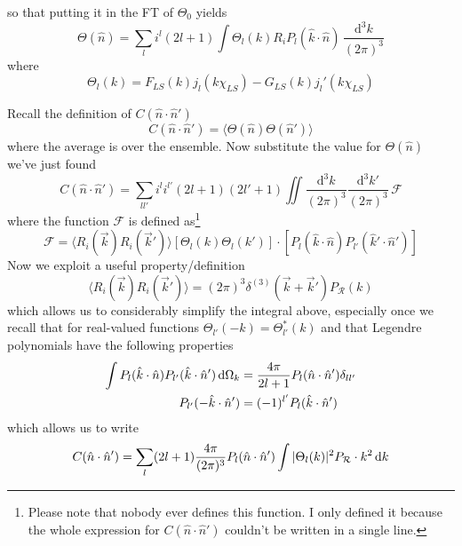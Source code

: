 so that putting it in the FT of $\Theta_{0}$ yields
\begin{equation}
    \Theta(\hat{n}) = \sum_{l}i^{l}(2l+1)\int \Theta_{l}(k)R_{i} P_{l}(\hat{k}\cdot\hat{n})\,\frac{\text{d}^{3}k}{(2\pi)^{3}}
\end{equation}
where 
\begin{equation}
    \Theta_{l}(k) = F_{LS}(k)j_{l}(k\chi_{LS})-G_{LS}(k)j_{l}'(k\chi_{LS})
\end{equation}
\par Recall the definition of $C(\hat{n}\cdot \hat{n}')$
\begin{equation}
    C(\hat{n}\cdot \hat{n}') = \langle \Theta (\hat{n})\Theta(\hat{n}')\rangle
\end{equation}
where the average is over the ensemble. Now substitute the value for $\Theta(\hat{n})$ we've just found
\begin{equation}
    C(\hat{n}\cdot \hat{n}') = \sum_{ll'}i^{l}i^{l'}(2l+1)(2l'+1) \iint \frac{\text{d}^{3}k}{(2\pi)^{3}} \frac{\text{d}^{3}k'}{(2\pi)^{3}}\,\mathcal{F}
\end{equation}
where the function $\mathcal{F}$ is defined as\footnote{Please note that nobody ever defines this function. I only defined it because the whole expression for $ C(\hat{n}\cdot \hat{n}')$ couldn't be written in a single line.}
\begin{equation}
    \mathcal{F} = \langle R_{i}(\vec{k})R_{i}(\vec{k}')\rangle \left[\Theta_{l}(k)\Theta_{l}(k')\right]\cdot \left[P_{l}(\hat{k}\cdot\hat{n})P_{l'}(\hat{k}'\cdot\hat{n}')\right]
\end{equation}
Now we exploit a useful property/definition
\begin{equation}
    \langle R_{i}(\vec{k})R_{i}(\vec{k}')\rangle = (2\pi)^{3}\delta^{(3)}(\vec{k}+\vec{k}')P_{\mathcal{R}}(k)
\end{equation}
which allows us to considerably simplify the integral above, especially once we recall that for real-valued functions $\Theta_{l'}(-k) = \Theta_{l'}^{*}(k)$ and that Legendre polynomials have the following properties
\begin{align}
    \int P_{l}(\hat{k}\cdot\hat{n})P_{l'}(\hat{k}\cdot\hat{n}')\,\text{d}\Omega_{k} &= \frac{4\pi}{2l+1}P_{l}(\hat{n}\cdot\hat{n}')\delta_{ll'} \\
    P_{l'}(-\hat{k}\cdot\hat{n}') &= (-1)^{l'}P_{l}(\hat{k}\cdot\hat{n}')
\end{align}
which allows us to write
\begin{equation}
    C(\hat{n}\cdot \hat{n}') = \sum_{l}(2l+1)\frac{4\pi}{(2\pi)^{3}}P_{l}(\hat{n}\cdot\hat{n}') \int |\Theta_{l}(k)|^{2}P_{\mathcal{R}}\cdot k^{2}\,\text{d}k
\end{equation}

